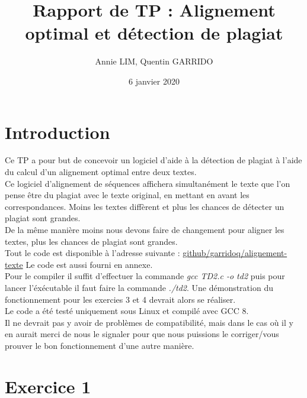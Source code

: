 \documentclass{article}
\title{Rapport de TP : Alignement optimal et détection de plagiat}
\author{Annie LIM, Quentin GARRIDO}
\date{6 janvier 2020}
\begin{document}
\maketitle
\tableofcontents
\pagebreak

\section{Introduction}

Ce TP a pour but de concevoir un logiciel d'aide à la détection de plagiat à
l'aide du calcul d'un alignement optimal entre deux textes.\\
Ce logiciel d'alignement de séquences affichera simultanément le texte que l'on
pense être du plagiat avec le texte original, en mettant en avant les correspondances.
Moins les textes diffèrent et plus les chances de détecter un plagiat sont
grandes.\\
De la même manière moins nous devons faire de changement pour aligner les
textes, plus les chances de plagiat sont grandes.\\

Tout le code est disponible à l'adresse suivante :
\href{https://github.com/garridoq/alignement-texte}{github/garridoq/alignement-texte}
Le code est aussi fourni en annexe.\\

Pour le compiler il suffit d'effectuer la commande \textit{gcc TD2.c -o td2}
puis pour lancer l'éxécutable il faut faire la commande \textit{./td2}.
Une démonstration du fonctionnement pour les exercies 3 et 4 devrait alors se
réaliser.\\

Le code a été testé uniquement sous Linux et compilé avec GCC 8.\\
Il ne devrait pas y avoir de problèmes de compatibilité, mais dans le cas où il
y en aurait merci de nous le signaler pour que nous puissions le corriger/vous
prouver le bon fonctionnement d'une autre manière. 

\section{Exercice 1}
\end{document}
